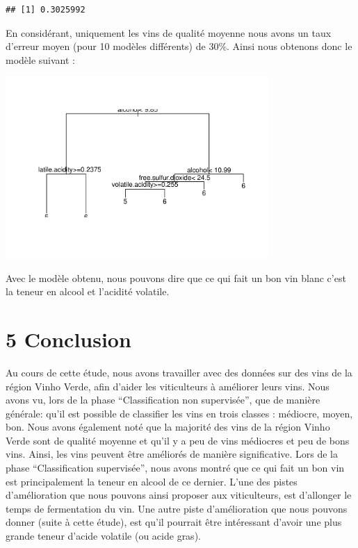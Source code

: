 \documentclass[
]{article}
\begin{document}
\begin{verbatim}
## [1] 0.3025992
\end{verbatim}

En considérant, uniquement les vins de qualité moyenne nous avons un
taux d'erreur moyen (pour 10 modèles différents) de 30\%. Ainsi nous
obtenons donc le modèle suivant :

\begin{center}
	\includegraphics[width=10cm]{repport_files/figure-latex/unnamed-chunk-30-1.pdf}
\end{center}

Avec le modèle obtenu, nous pouvons dire que ce qui fait un bon vin
blanc c'est la teneur en alcool et l'acidité volatile.

\hypertarget{conclusion}{%
\section{5 Conclusion}\label{conclusion}}

Au cours de cette étude, nous avons travailler avec des données sur des
vins de la région Vinho Verde, afin d'aider les viticulteurs à améliorer
leurs vins. Nous avons vu, lors de la phase ``Classification non
supervisée'', que de manière générale: qu'il est possible de classifier
les vins en trois classes : médiocre, moyen, bon. Nous avons également
noté que la majorité des vins de la région Vinho Verde sont de qualité
moyenne et qu'il y a peu de vins médiocres et peu de bons vins. Ainsi,
les vins peuvent être améliorés de manière significative. Lors de la
phase ``Classification supervisée'', nous avons montré que ce qui fait
un bon vin est principalement la teneur en alcool de ce dernier. L'une
des pistes d'amélioration que nous pouvons ainsi proposer aux
viticulteurs, est d'allonger le temps de fermentation du vin. Une autre
piste d'amélioration que nous pouvons donner (suite à cette étude), est
qu'il pourrait être intéressant d'avoir une plus grande teneur d'acide
volatile (ou acide gras).
\end{document}
